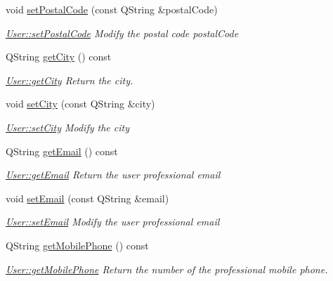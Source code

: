 \begin{DoxyCompactItemize}
void \hyperlink{classModels_1_1User_a5a75307bb95eae0970efd282519ec5ba}{set\+Postal\+Code} (const Q\+String \&postal\+Code)
\begin{DoxyCompactList}\small\item\em \hyperlink{classModels_1_1User_a5a75307bb95eae0970efd282519ec5ba}{User\+::set\+Postal\+Code} Modify the postal code {\itshape postal\+Code} \end{DoxyCompactList}\item 
Q\+String \hyperlink{classModels_1_1User_a6ee95d68097373de6273bd0386f2dff1}{get\+City} () const 
\begin{DoxyCompactList}\small\item\em \hyperlink{classModels_1_1User_a6ee95d68097373de6273bd0386f2dff1}{User\+::get\+City} Return the city. \end{DoxyCompactList}\item 
void \hyperlink{classModels_1_1User_a98c035e4275b8170bec888bea05b24d9}{set\+City} (const Q\+String \&city)
\begin{DoxyCompactList}\small\item\em \hyperlink{classModels_1_1User_a98c035e4275b8170bec888bea05b24d9}{User\+::set\+City} Modify the {\itshape city} \end{DoxyCompactList}\item 
Q\+String \hyperlink{classModels_1_1User_a90b1f27762a58bbe2e903d8299678b74}{get\+Email} () const 
\begin{DoxyCompactList}\small\item\em \hyperlink{classModels_1_1User_a90b1f27762a58bbe2e903d8299678b74}{User\+::get\+Email} Return the user professional {\itshape email} \end{DoxyCompactList}\item 
void \hyperlink{classModels_1_1User_a69fc70b244bccf493df300af812a18c3}{set\+Email} (const Q\+String \&email)
\begin{DoxyCompactList}\small\item\em \hyperlink{classModels_1_1User_a69fc70b244bccf493df300af812a18c3}{User\+::set\+Email} Modify the user professional {\itshape email} \end{DoxyCompactList}\item 
Q\+String \hyperlink{classModels_1_1User_aba9d318cad6935104eff02f6b5659d5c}{get\+Mobile\+Phone} () const 
\begin{DoxyCompactList}\small\item\em \hyperlink{classModels_1_1User_aba9d318cad6935104eff02f6b5659d5c}{User\+::get\+Mobile\+Phone} Return the number of the professional mobile phone. \end{DoxyCompactList}\item 

\end{DoxyCompactItemize}
